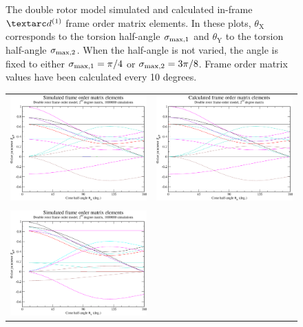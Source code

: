 \begin{figure}
\begin{tabular}{@{}cc@{}}
  \end{tabular}
  \caption[Double rotor simulated and calculated in-frame Daeg$^{(1)}$ elements.]{
    The double rotor model simulated and calculated in-frame $\FOone$ frame order matrix elements.
    In these plots, $\theta_\textrm{X}$ corresponds to the torsion half-angle $\sigma_{\textrm{max,1}}$ and $\theta_\textrm{Y}$ to the torsion half-angle $\sigma_{\textrm{max,2}}$.
    When the half-angle is not varied, the angle is fixed to either $\sigma_{\textrm{max,1}} = \pi/4$ or $\sigma_{\textrm{max,2}} = 3\pi/8$.
    Frame order matrix values have been calculated every 10 degrees.
  }
  \label{fig: simulated and calculated in-frame 1st degree double rotor frame order}
\end{figure}

\begin{figure}
\centering
  \begin{tabular}{@{}cc@{}}
    \includegraphics[width=.5\textwidth]{images/frame_order_matrix/Sijkl_double_rotor_in_frame_theta_x_ens1000000.eps} &
    \includegraphics[width=.5\textwidth]{images/frame_order_matrix/Sijkl_double_rotor_in_frame_theta_x_calc.eps} \\
    \\[-5pt]
    \includegraphics[width=.5\textwidth]{images/frame_order_matrix/Sijkl_double_rotor_in_frame_theta_y_ens1000000.eps} &

\end{tabular}
\end{figure}
